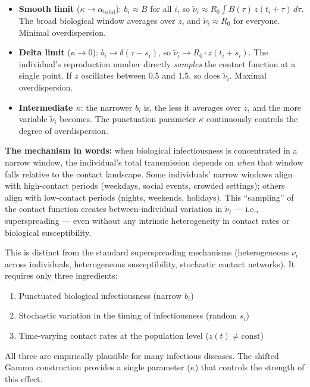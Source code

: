 \documentclass[11pt]{article}
\begin{document}
\begin{itemize}
\item \textbf{Smooth limit} ($\kappa \to \alpha_{\text{total}}$): $b_i \approx B$ for all $i$, so $\tilde{\nu}_i \approx R_0 \int B(\tau)\,z(t_i + \tau)\,d\tau$. The broad biological window averages over $z$, and $\tilde{\nu}_i \approx R_0$ for everyone. Minimal overdispersion.

\item \textbf{Delta limit} ($\kappa \to 0$): $b_i \to \delta(\tau - s_i)$, so $\tilde{\nu}_i \to R_0 \cdot z(t_i + s_i)$. The individual's reproduction number directly \textit{samples} the contact function at a single point. If $z$ oscillates between 0.5 and 1.5, so does $\tilde{\nu}_i$. Maximal overdispersion.

\item \textbf{Intermediate $\kappa$}: the narrower $b_i$ is, the less it averages over $z$, and the more variable $\tilde{\nu}_i$ becomes. The punctuation parameter $\kappa$ continuously controls the degree of overdispersion.
\end{itemize}

\textbf{The mechanism in words:} when biological infectiousness is concentrated in a narrow window, the individual's total transmission depends on \textit{when} that window falls relative to the contact landscape. Some individuals' narrow windows align with high-contact periods (weekdays, social events, crowded settings); others align with low-contact periods (nights, weekends, holidays). This ``sampling'' of the contact function creates between-individual variation in $\tilde{\nu}_i$ --- i.e., superspreading --- even without any intrinsic heterogeneity in contact rates or biological susceptibility.

This is distinct from the standard superspreading mechanisms (heterogeneous $\nu_i$ across individuals, heterogeneous susceptibility, stochastic contact networks). It requires only three ingredients:
\begin{enumerate}
\item Punctuated biological infectiousness (narrow $b_i$)
\item Stochastic variation in the timing of infectiousness (random $s_i$)
\item Time-varying contact rates at the population level ($z(t) \neq \text{const}$)
\end{enumerate}

All three are empirically plausible for many infectious diseases. The shifted Gamma construction provides a single parameter ($\kappa$) that controls the strength of this effect.
\end{document}
